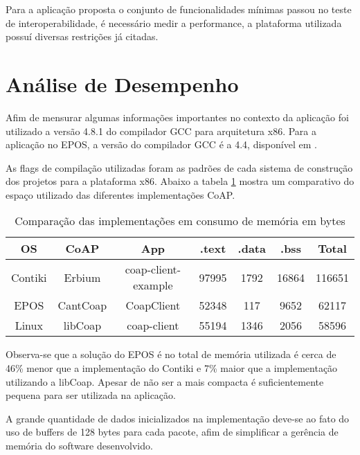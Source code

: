 Para a aplica\c{c}\~ao proposta o conjunto de funcionalidades m\'inimas passou no teste de interoperabilidade, \'e necess\'ario medir a performance, a plataforma utilizada possu\'i diversas restri\c{c}\~oes j\'a citadas.

\section{An\'alise de Desempenho}

Afim de mensurar algumas informa\c{c}\~oes importantes no contexto da aplica\c{c}\~ao foi utilizado a vers\~ao 4.8.1 do compilador GCC para arquitetura x86. Para a aplica\c{c}\~ao no EPOS,  a vers\~ao do compilador GCC \'e a 4.4, dispon\'ivel em \cite{eposProject}.

As flags de compila\c{c}\~ao utilizadas foram as padr\~oes de cada sistema de constru\c{c}\~ao dos projetos para a plataforma x86. Abaixo a tabela \ref{comparacaoCoap} mostra um comparativo do espa\c{c}o utilizado das diferentes implementa\c{c}\~oes CoAP.

\begin{table}[H]
\label{comparacaoCoap}
\centering
\begin{tabular}{@{}ccccccc@{}}
    \toprule
    OS & CoAP & App & .text & .data & .bss & Total\\ \midrule
    Contiki& Erbium & coap-client-example & 97995 & 1792 & 16864 & 116651 \\
    EPOS & CantCoap & CoapClient & 52348 & 117 & 9652 & 62117 \\
    Linux & libCoap & coap-client & 55194 & 1346 & 2056 & 58596 \\
    \bottomrule
\end{tabular}
\caption{Compara\c{c}\~ao das implementa\c{c}\~oes em consumo de mem\'oria em bytes}
\end{table}

Observa-se que a solu\c{c}\~ao do EPOS \'e no total de mem\'oria utilizada \'e cerca de 46\% menor que a implementa\c{c}\~ao do Contiki e 7\% maior que a implementa\c{c}\~ao utilizando a libCoap. Apesar de n\~ao ser a mais compacta \'e suficientemente pequena para ser utilizada na aplica\c{c}\~ao.

A grande quantidade de dados inicializados na implementa\c{c}\~ao deve-se ao fato do uso de buffers de 128 bytes para cada pacote, afim de simplificar a ger\^encia de mem\'oria do software desenvolvido. %

